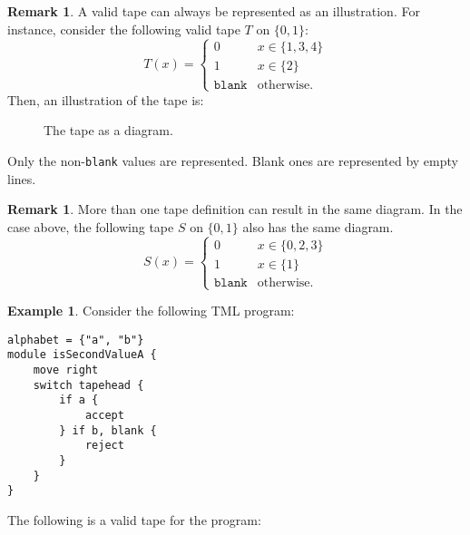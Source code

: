 \documentclass{amsart}
\theoremstyle{definition}
\newtheorem{remark}[rules]{Remark}
\newtheorem{example}[rules]{Example}
\begin{document}
    \begin{remark}
        A valid tape can always be represented as an illustration. For instance, consider the following valid tape $T$ on $\{0, 1\}$:
        \[T(x) = \begin{cases}
            0 & x \in \{1, 3, 4\} \\
            1 & x \in \{2\} \\
            \texttt{blank} & \text{otherwise}.
        \end{cases}\]
        Then, an illustration of the tape is:
        \begin{figure}[H]
            \centering
            \caption{The tape as a diagram.}
        \end{figure}
        \noindent Only the non-\texttt{blank} values are represented. Blank ones are represented by empty lines.
    \end{remark}
    \begin{remark}
        More than one tape definition can result in the same diagram. In the case above, the following tape $S$ on $\{0, 1\}$ also has the same diagram.
        \[S(x) = \begin{cases}
            0 & x \in \{0, 2, 3\} \\
            1 & x \in \{1\} \\
            \texttt{blank} & \text{otherwise}.
        \end{cases}\]        
    \end{remark}
    \begin{example}
Consider the following TML program:
\begin{lstlisting}[language=TML]
alphabet = {"a", "b"}
module isSecondValueA {
    move right
    switch tapehead {
        if a {
            accept
        } if b, blank {
            reject
        }
    }
}
\end{lstlisting}
    The following is a valid tape for the program:
    \begin{figure}[H]
        \centering
    \end{figure}
    \end{example}
\end{document}
